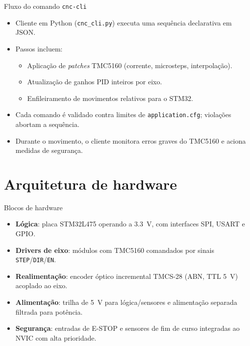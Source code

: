 \documentclass[aspectratio=169]{beamer}
\begin{document}
\begin{frame}{Fluxo do comando \texttt{cnc-cli}}
  \begin{itemize}
    \item Cliente em Python (\texttt{cnc\_cli.py}) executa uma sequência declarativa em JSON.
    \item Passos incluem:
      \begin{itemize}
        \item Aplicação de \emph{patches} TMC5160 (corrente, microsteps, interpolação).
        \item Atualização de ganhos PID inteiros por eixo.
        \item Enfileiramento de movimentos relativos para o STM32.
      \end{itemize}
    \item Cada comando é validado contra limites de \texttt{application.cfg}; violações abortam a sequência.
    \item Durante o movimento, o cliente monitora erros graves do TMC5160 e aciona medidas de segurança.
  \end{itemize}
\end{frame}

\section{Arquitetura de hardware}

\begin{frame}{Blocos de hardware}
  \begin{itemize}
    \item \textbf{Lógica}: placa STM32L475 operando a \SI{3.3}{V}, com interfaces SPI, USART e GPIO.
    \item \textbf{Drivers de eixo}: módulos com TMC5160 comandados por sinais \texttt{STEP}/\texttt{DIR}/\texttt{EN}.
    \item \textbf{Realimentação}: encoder óptico incremental TMCS-28 (ABN, TTL \SI{5}{V}) acoplado ao eixo.
    \item \textbf{Alimentação}: trilha de \SI{5}{V} para lógica/sensores e alimentação separada filtrada para potência.
    \item \textbf{Segurança}: entradas de E-STOP e sensores de fim de curso integradas ao NVIC com alta prioridade.
  \end{itemize}
\end{frame}
\end{document}
